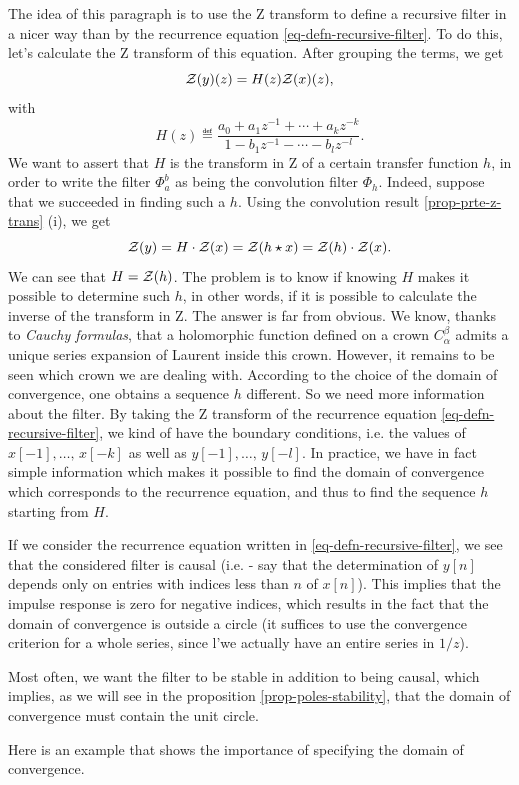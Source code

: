 
 
The idea of this paragraph is to use the Z transform to define a recursive filter in a nicer way than by the recurrence equation \eqref{eq-defn-recursive-filter}. To do this, let's calculate the Z transform of this equation. After grouping the terms, we get
\begin{equation*}
\mathcal{Z} (y) (z) = H (z) \mathcal{Z} (x) (z),
\end{equation*}
with
\begin{equation*}
H (z) \eqdef \frac{a_0 + a_1 z^{-1} + \cdots + a_k z^{- k}}{1 - b_1 z^{-1} - \cdots - b_l z^{- l }}.
\end{equation*}
We want to assert that $ H $ is the transform in Z of a certain transfer function $ h $, in order to write the filter $ \Phi_a^b $ as being the convolution filter $ \Phi_h $. Indeed, suppose that we succeeded in finding such a $ h $. Using the convolution result \ref{prop-prte-z-trans} (i), we get
\begin{equation*}
\mathcal{Z} (y) = H \cdot \mathcal{Z} (x) = \mathcal{Z} (h \star x) = \mathcal{Z} (h) \cdot \mathcal{Z} (x).
\end{equation*}
  We can see that $ H = \mathcal{Z} (h) $. The problem is to know if knowing $ H $ makes it possible to determine such $ h $, in other words, if it is possible to calculate the inverse of the transform in Z. The answer is far from obvious. We know, thanks to \textit{Cauchy formulas}, that a holomorphic function defined on a crown $ C_{\alpha}^{\beta} $ admits a unique series expansion of Laurent inside this crown. However, it remains to be seen which crown we are dealing with. According to the choice of the domain of convergence, one obtains a sequence $ h $ different. So we need more information about the filter. By taking the Z transform of the recurrence equation \eqref{eq-defn-recursive-filter}, we kind of have  the boundary conditions, i.e. the values of $ x [-1], \ldots, \, x [-k] $ as well as $ y [-1], \ldots, \, y [-l] $. In practice, we have in fact simple information which makes it possible to find the domain of convergence which corresponds to the recurrence equation, and thus to find the sequence $ h $ starting from $ H $. \begin{rs}
\item {}  If we consider the recurrence equation written in \eqref{eq-defn-recursive-filter}, we see that the considered filter is causal (i.e. - say that the determination of $ y [n] $ depends only on entries with indices less than $ n $ of $ x [n] $). This implies that the impulse response is zero for negative indices, which results in the fact that the domain of convergence is outside a circle (it suffices to use the convergence criterion for a whole series, since l'we actually have an entire series in $ 1 / z $).
\item Most often, we want the filter to be stable in addition to being causal, which implies, as we will see in the proposition \ref{prop-poles-stability}, that the domain of convergence must contain the unit circle.
\end{rs} Here is an example that shows the importance of specifying the domain of convergence.
 
